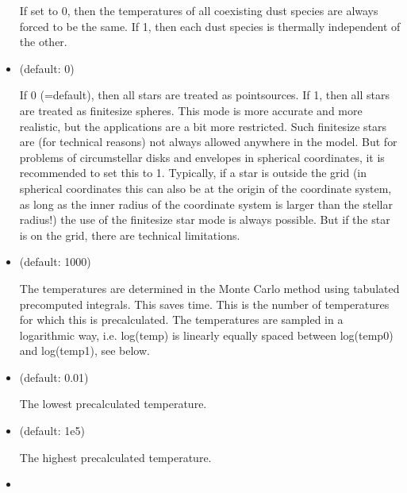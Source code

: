 \documentclass[letterpaper,10pt,english]{sphinxmanual}
\begin{document}
\begin{itemize}
If set to 0, then the temperatures of all coexisting dust species are
always forced to be the same. If 1, then each dust species is thermally
independent of the other.

\item {} 
 (default: 0)

If 0 (=default), then all stars are treated as point\sphinxhyphen{}sources. If 1, then
all stars are treated as finite\sphinxhyphen{}size spheres. This mode is more accurate
and more realistic, but the applications are a bit more restricted.
Such finite\sphinxhyphen{}size stars are (for technical reasons) not always allowed
anywhere in the model. But for problems of circumstellar disks and envelopes
in spherical coordinates, it is recommended to set this to 1. Typically,
if a star is outside the grid (in spherical coordinates this can also be
at the origin of the coordinate system, as long as the inner radius of
the coordinate system is larger than the stellar radius!) the use of the
finite\sphinxhyphen{}size star mode is always possible. But if the star is on the grid,
there are technical limitations.

\item {} 
 (default: 1000) 

The temperatures are determined in the Monte Carlo method using tabulated
pre\sphinxhyphen{}computed integrals. This saves time. This is the number of
temperatures for which this is precalculated. The temperatures are sampled
in a logarithmic way, i.e. log(temp) is linearly equally spaced between
log(temp0) and log(temp1), see below.

\item {} 
 (default: 0.01) 

The lowest pre\sphinxhyphen{}calculated temperature.

\item {} 
 (default: 1e5) 

The highest pre\sphinxhyphen{}calculated temperature.

\item {} 


\end{itemize}
\end{document}

